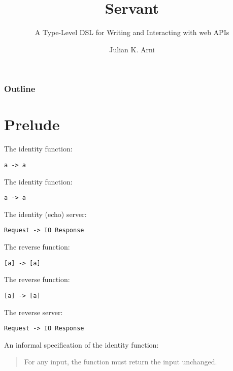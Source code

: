 \documentclass{beamer}
\title{Servant}
\subtitle{A Type-Level DSL for Writing and Interacting with web APIs}
\author{Julian K. Arni}
\begin{document}
\frame{\titlepage}

\begin{frame}
    \frametitle{Outline}
    \tableofcontents[]
\end{frame}

\section{Prelude} %
\begin{frame}[fragile]
    The identity function:
\begin{verbatim}
a -> a
\end{verbatim}
\end{frame}

\begin{frame}[fragile]
    The identity function:
\begin{verbatim}
a -> a
\end{verbatim}
    The identity (echo) server:
\begin{verbatim}
Request -> IO Response
\end{verbatim}
\end{frame}

\begin{frame}[fragile]
    The reverse function:
\begin{verbatim}
[a] -> [a]
\end{verbatim}
\end{frame}

\begin{frame}[fragile]
    The reverse function:
\begin{verbatim}
[a] -> [a]
\end{verbatim}
    The reverse server:
\begin{verbatim}
Request -> IO Response
\end{verbatim}
\end{frame}

\begin{frame}[fragile]
    An informal specification of the identity function:
\begin{quotation}
    For any input, the function must return the input unchanged.
\end{quotation}
\end{frame}
\end{document}
